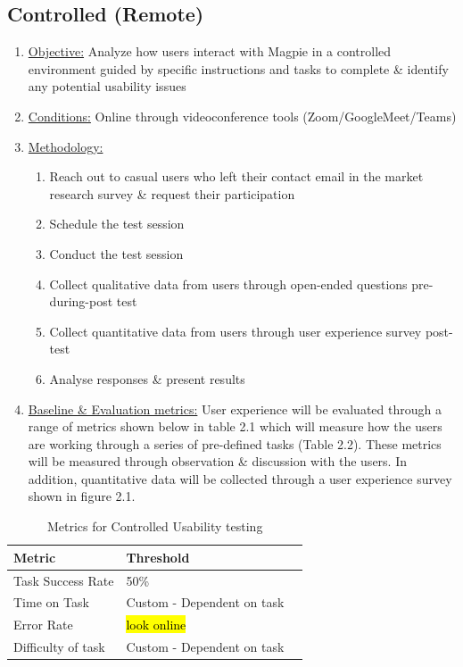 \documentclass{report}
\begin{document}
\subsection{Controlled (Remote)}
\begin{enumerate}
    \item \underline{Objective:} Analyze how users interact with Magpie in a
          controlled environment guided by specific instructions and tasks to complete
          \& identify any potential usability issues
    \item \underline{Conditions:} Online through videoconference tools
          (Zoom/GoogleMeet/Teams)
    \item \underline{Methodology:}
          \begin{enumerate}
              \item Reach out to casual users who left their contact email in the market research survey \& request their participation
              \item Schedule the test session
              \item Conduct the test session
              \item Collect qualitative data from users through open-ended questions pre-during-post test
              \item Collect quantitative data from users through user experience survey post-test
              \item Analyse responses \& present results
          \end{enumerate}
    \item \underline{Baseline \& Evaluation metrics:} User experience will be evaluated through a range of metrics shown below in table 2.1  which will measure how the users are working through a series of pre-defined tasks (Table 2.2). These metrics will be measured through observation \& discussion with the users. In addition, quantitative data will be collected through a user experience survey shown in figure 2.1.
\end{enumerate}
\begin{table}[h!]
    \centering
    \caption{Metrics for Controlled Usability testing}
    \label{tab:table1}
    \begin{tabularx}{\textwidth}{|p{}|X|X|}
        \hline
        \textbf{Metric}    & \textbf{Threshold}         \\ \hline
        Task Success Rate  & 50\%                       \\ \hline
        Time on Task       & Custom - Dependent on task \\ \hline
        Error Rate         & \hl{look online}           \\ \hline
        Difficulty of task & Custom - Dependent on task \\ \hline
    \end{tabularx}
\end{table}
\end{document}
